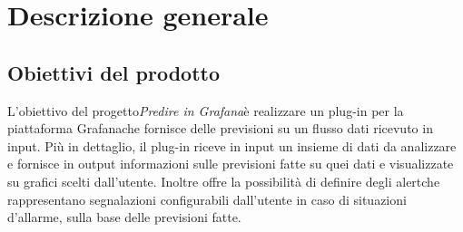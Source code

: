 \section{Descrizione generale}
	\subsection{Obiettivi del prodotto}
	L'obiettivo del progetto\glosp \textit{Predire in Grafana}\glosp è realizzare un plug-in per la piattaforma Grafana\glosp che fornisce delle previsioni su un flusso dati ricevuto in input.
	Più in dettaglio, il plug-in riceve in input un insieme di dati da analizzare e fornisce in output informazioni sulle previsioni fatte su quei dati e visualizzate su grafici scelti dall'utente. Inoltre offre la possibilità di definire degli alert\glosp che rappresentano segnalazioni configurabili dall'utente in caso di situazioni d'allarme, sulla base delle previsioni fatte. 
